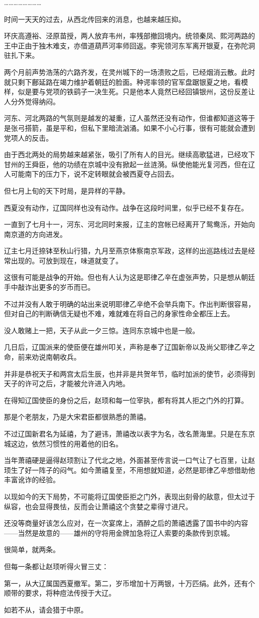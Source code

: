 ……………………

时间一天天的过去，从西北传回来的消息，也越来越压抑。

环庆高遵裕、泾原苗授，两人放弃韦州，率残部撤回境内。统领秦凤、熙河两路的王中正由于独木难支，亦借道葫芦河率师回返。李宪领河东军离开银夏，在弥陀洞驻扎下来。

两个月前声势浩荡的六路齐发，在灵州城下的一场溃败之后，已经烟消云散。此时就只剩下鄜延路在竭力维护着朝廷的脸面。种谔率领的官军盘踞银夏之地，看模样，似是要与党项的铁鹞子一决生死。只是他本人竟然已经回镇银州，这份反差让人分外觉得纳闷。

河东、河北两路的气氛则是越发的凝重，辽人虽然还没有动作，但谁都知道这等于是张弓搭箭，虽是平和，但私下里暗流汹涌。如果不小心行事，很有可能就会遭到党项人的反击。

由于西北两处的局势越来越紧张，吸引了所有人的目光。继续高歌猛进，已经攻下甘州的王舜臣，他的功绩在京城中没有掀起一丝涟漪。纵使他能光复河西，但在辽人可能南下的压力下，说不定转眼就会被西夏夺占回去。

但七月上旬的天下时局，是异样的平静。

西夏没有动作，辽国同样也没有动作。战争在这段时间里，似乎已经不复存在。

一直到了七月十一，河东、河北同时来报，辽主的宫帐已经离开了鸳鸯泺，开始向南京道的方向进发。

辽主七月迁捺钵至秋山行猎，九月至燕京体察南京军政，这样的出巡路线过去是经常出现的。可放到现在，味道就变了。

这很有可能是战争的开始。但也有人认为这是耶律乙辛在虚张声势，只是想从朝廷手中敲诈出更多的岁币而已。

不过并没有人敢于明确的站出来说明耶律乙辛绝不会举兵南下。作出判断很容易，但对自己的判断确信无疑也不难，难就难在将自己的身家性命全都压上去。

没人敢赌上一把，天子从此一夕三惊。连同东京城中也是一般。

几日后，辽国派来的使臣便在雄州叩关，声称是奉了辽国新帝以及尚父耶律乙辛之命，前来劝说南朝收兵。

并非是恭祝天子和两宫太后生辰，也并非是共贺年节，临时加派的使节，必须得到天子的许可之后，才能被允许进入内地。

在得知辽国使臣的身份之后，赵顼和每一位宰执，都有将其人拒之门外的打算。

那是个老朋友，乃是大宋君臣都很熟悉的萧禧。

不过辽国新君名为延禧，为了避讳，萧禧改以表字为名，改名萧海里。只是在东京城这边，依然习惯性的用着他的旧名。

当年萧禧硬是逼得赵顼割让了代北之地，外面甚至传言说一口气让了七百里，让赵顼生了好一阵子的闷气。如今萧禧复至，不用想就知道，必然是耶律乙辛想借助他丰富讹诈的经验。

以现如今的天下局势，不可能将辽国使臣拒之门外，表现出刻骨的敌意，但太过于纵容，也会显得畏怯，反而会让萧禧这个贪婪之辈得寸进尺。

还没等商量好该怎么应对，在一次宴席上，酒醉之后的萧禧透露了国书中的内容——当然是故意的——雄州的守将用金牌加急将辽人索要的条款传到京城。

很简单，就两条。

但每一条都让赵顼听得火冒三丈：

第一，从大辽属国西夏撤军。第二，岁币增加十万两银，十万匹绢。此外，还有个顺带的要求，将种痘法传授于大辽。

如若不从，请会猎于中原。

